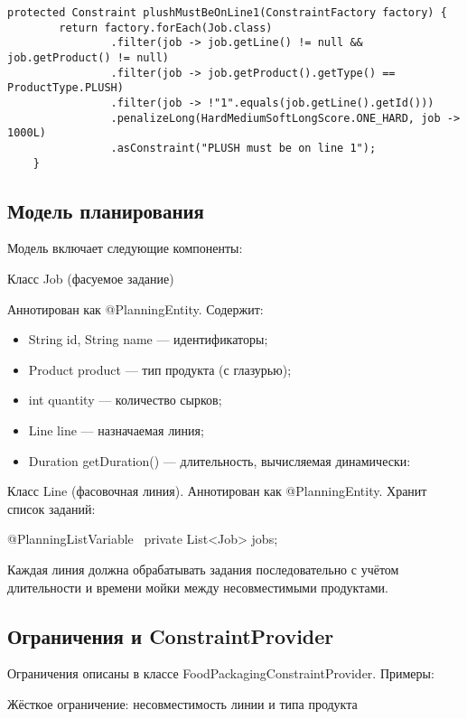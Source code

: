 \begin{lstlisting}[caption={ Пример ограничения производства сырков Плюш только на линии №1}, label={lst:fcProvider}]
protected Constraint plushMustBeOnLine1(ConstraintFactory factory) {
        return factory.forEach(Job.class)
                .filter(job -> job.getLine() != null && job.getProduct() != null)
                .filter(job -> job.getProduct().getType() == ProductType.PLUSH)
                .filter(job -> !"1".equals(job.getLine().getId()))
                .penalizeLong(HardMediumSoftLongScore.ONE_HARD, job -> 1000L)
                .asConstraint("PLUSH must be on line 1");
    }
\end{lstlisting}

\subsection{Модель планирования}

Модель включает следующие компоненты: \

Класс Job (фасуемое задание)

Аннотирован как @PlanningEntity. Содержит:

\begin{itemize}
    \item String id, String name — идентификаторы;
    \item Product product — тип продукта (с глазурью);
    \item int quantity — количество сырков;
    \item Line line — назначаемая линия;
    \item Duration getDuration() — длительность, вычисляемая динамически:
\end{itemize}

Класс Line (фасовочная линия). Аннотирован как @PlanningEntity. Хранит список заданий:

@PlanningListVariable \
private List<Job> jobs; \

Каждая линия должна обрабатывать задания последовательно с учётом длительности и времени мойки между несовместимыми продуктами. \

\subsection{Ограничения и ConstraintProvider}

Ограничения описаны в классе FoodPackagingConstraintProvider. Примеры:

Жёсткое ограничение: несовместимость линии и типа продукта \

